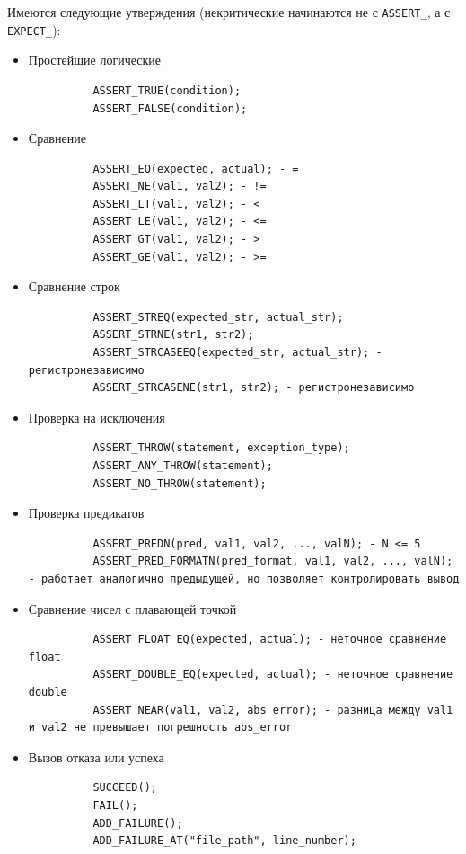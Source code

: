 \documentclass[12pt, twoside]{report}
\begin{document}
Имеются следующие утверждения (некритические начинаются не с \texttt{ASSERT\_}, а с \texttt{EXPECT\_}):

\begin{itemize}
  \item Простейшие логические
        \begin{verbatim}
          ASSERT_TRUE(condition);
          ASSERT_FALSE(condition);
        \end{verbatim}

  \item Сравнение
        \begin{verbatim}
          ASSERT_EQ(expected, actual); - =
          ASSERT_NE(val1, val2); - !=
          ASSERT_LT(val1, val2); - <
          ASSERT_LE(val1, val2); - <=
          ASSERT_GT(val1, val2); - >
          ASSERT_GE(val1, val2); - >=
        \end{verbatim}

  \item Сравнение строк
        \begin{verbatim}
          ASSERT_STREQ(expected_str, actual_str);
          ASSERT_STRNE(str1, str2);
          ASSERT_STRCASEEQ(expected_str, actual_str); - регистронезависимо
          ASSERT_STRCASENE(str1, str2); - регистронезависимо
        \end{verbatim}

  \item Проверка на исключения
        \begin{verbatim}
          ASSERT_THROW(statement, exception_type);
          ASSERT_ANY_THROW(statement);
          ASSERT_NO_THROW(statement);
        \end{verbatim}

  \item Проверка предикатов
        \begin{verbatim}
          ASSERT_PREDN(pred, val1, val2, ..., valN); - N <= 5
          ASSERT_PRED_FORMATN(pred_format, val1, val2, ..., valN); - работает аналогично предыдущей, но позволяет контролировать вывод
        \end{verbatim}

  \item Сравнение чисел с плавающей точкой
        \begin{verbatim}
          ASSERT_FLOAT_EQ(expected, actual); - неточное сравнение float
          ASSERT_DOUBLE_EQ(expected, actual); - неточное сравнение double
          ASSERT_NEAR(val1, val2, abs_error); - разница между val1 и val2 не превышает погрешность abs_error
        \end{verbatim}

  \item Вызов отказа или успеха
        \begin{verbatim}
          SUCCEED();
          FAIL();
          ADD_FAILURE();
          ADD_FAILURE_AT("file_path", line_number);
        \end{verbatim}
\end{itemize}
\end{document}
